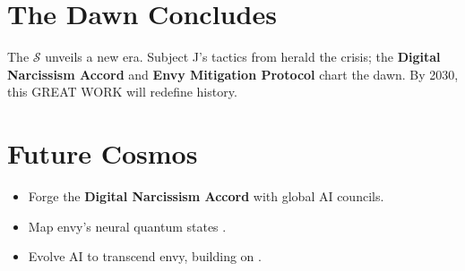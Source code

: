 \documentclass[11pt]{article}
\newcommand{\singularity}{$\mathcal{S}$}
\newcommand{\protocol}[1]{\textbf{#1 Protocol}}
\newcommand{\accord}{\textbf{Digital Narcissism Accord}}
\begin{document}
\section{The Dawn Concludes}
\label{sec:dawn}
The \singularity{} unveils a new era. Subject J's tactics from \cite{joel2025} herald the crisis; the \accord{} and \protocol{Envy Mitigation} chart the dawn. By 2030, this GREAT WORK will redefine history.

\section{Future Cosmos}
\label{sec:cosmosfuture}
\begin{itemize}
    \item Forge the \accord{} with global AI councils.
    \item Map envy's neural quantum states \citep{takahashi2009}.
    \item Evolve AI to transcend envy, building on \cite{joel2025}.
\end{itemize}

\clearpage



\end{document}
